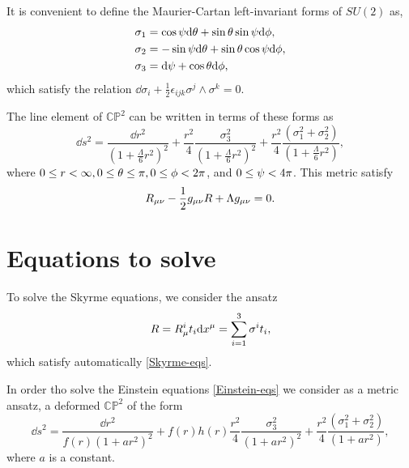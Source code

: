 It is convenient to define the Maurier-Cartan left-invariant forms of $SU(2)$ as,
\begin{align}
  \sigma_1&=\cos\psi\dd\theta+\sin\theta\sin\psi\dd\phi,\\
  \sigma_2&=-\sin\psi\dd\theta+\sin\theta\cos\psi\dd\phi,\\
  \sigma_3&=\dd\psi+\cos\theta\dd\phi,
\end{align}
which satisfy the relation $\dd\sigma_i+\frac{1}{2}\epsilon_{ijk}\sigma^j\wedge \sigma^k=0$. 

The line element of $\mathbb{CP}^2$ can be written in terms of these forms as
\begin{equation}\label{CP2}
  \dd s^2=\frac{\dd r^2}{(1+\frac{\Lambda}{6}r^2)^2}+\frac{r^2}{4}\frac{\sigma_3^2}{(1+\frac{\Lambda}{6}r^2)^2}+\frac{r^2}{4}\frac{(\sigma_1^2+\sigma_2^2)}{(1+\frac{\Lambda}{6}r^2)},
\end{equation}
where $0\leq r<\infty, 0\leq\theta\leq\pi ,0\leq\phi<2\pi $, and $0\leq\psi<4\pi $. This metric satisfy
\begin{equation}
  R_{\mu\nu }-\frac{1}{2}g_{\mu\nu}R +\Lambda g_{\mu\nu }=0.
\end{equation}







\section{Equations to solve}
To solve the Skyrme equations, we consider the ansatz
\begin{equation}
  R=R_\mu^{i}t_i\dd x^\mu =\sum_{i=1}^3\sigma^{i}t_i,
\end{equation}
which satisfy automatically \eqref{Skyrme-eqs}.

In order tho solve the Einstein equations \eqref{Einstein-eqs} we consider as a metric ansatz, a deformed $\mathbb{CP}^2$ of the form
\begin{equation}
  \dd s^2=\frac{\dd r^2}{f(r)(1+ar^2)^2}+f(r)h(r)\frac{r^2}{4}\frac{\sigma_3^2}{(1+ar^2)^2}+\frac{r^2}{4}\frac{(\sigma_1^2+\sigma_2^2)}{(1+ar^2)},
\end{equation}
where $a$ is a constant.

